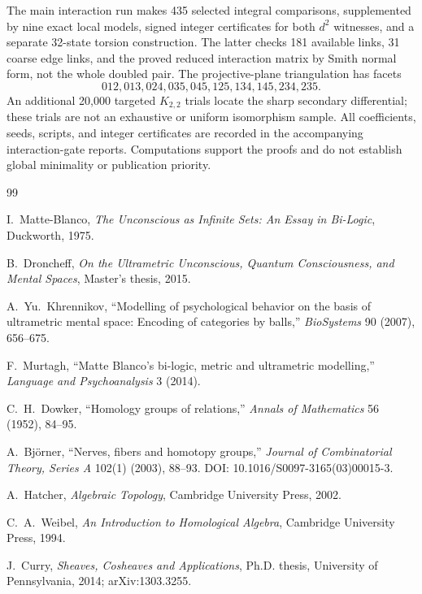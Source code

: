 \documentclass[11pt]{article}
\begin{document}
The main interaction run makes 435 selected integral comparisons, supplemented
by nine exact local models, signed integer certificates for both $d^2$
witnesses, and a separate 32-state torsion construction.  The latter checks
181 available links, 31 coarse edge links, and the proved reduced interaction
matrix by Smith normal form, not the whole doubled pair.  The projective-plane
triangulation has facets
\[
012,013,024,035,045,125,134,145,234,235.
\]
An additional 20,000 targeted $K_{2,2}$ trials locate the sharp secondary
differential; these trials are not an exhaustive or uniform isomorphism sample.
All coefficients, seeds, scripts, and integer certificates are recorded in
the accompanying interaction-gate reports.  Computations support the proofs
and do not establish global minimality or publication priority.

\begin{thebibliography}{99}
\small

I.~Matte-Blanco,
\emph{The Unconscious as Infinite Sets: An Essay in Bi-Logic},
Duckworth, 1975.

B.~Droncheff,
\emph{On the Ultrametric Unconscious, Quantum Consciousness, and Mental Spaces},
Master's thesis, 2015.

A.~Yu.~Khrennikov,
``Modelling of psychological behavior on the basis of ultrametric mental space: Encoding of categories by balls,''
\emph{BioSystems} 90 (2007), 656--675.

F.~Murtagh,
``Matte Blanco's bi-logic, metric and ultrametric modelling,''
\emph{Language and Psychoanalysis} 3 (2014).

C.~H.~Dowker,
``Homology groups of relations,''
\emph{Annals of Mathematics} 56 (1952), 84--95.

A.~Bj\"orner,
``Nerves, fibers and homotopy groups,''
\emph{Journal of Combinatorial Theory, Series A} 102(1) (2003), 88--93.
DOI: 10.1016/S0097-3165(03)00015-3.

A.~Hatcher,
\emph{Algebraic Topology},
Cambridge University Press, 2002.

C.~A.~Weibel,
\emph{An Introduction to Homological Algebra},
Cambridge University Press, 1994.

J.~Curry,
\emph{Sheaves, Cosheaves and Applications},
Ph.D. thesis, University of Pennsylvania, 2014; arXiv:1303.3255.


\end{thebibliography}
\end{document}
